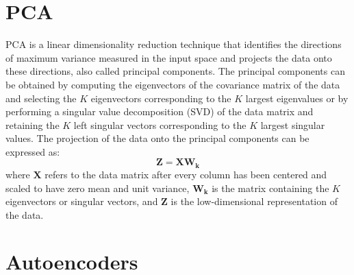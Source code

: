 \documentclass[10pt,conference,compsocconf]{IEEEtran}
\begin{document}
\section[]{PCA}
PCA is a linear dimensionality reduction technique that identifies the directions of maximum variance measured in the input space and projects the data onto these directions, also called principal components. The principal components can be obtained by computing the eigenvectors of the covariance matrix of the data and selecting the \( K \) eigenvectors corresponding to the \( K \) largest eigenvalues or by performing a  singular value decomposition (SVD) of the data matrix and retaining the \( K \) left singular vectors corresponding to the \( K \) largest singular values. The projection of the data onto the principal components can be expressed as:
\[
\mathbf{Z} = \mathbf{X} \mathbf{W_k}
\]
where $\mathbf{X}$ refers to the data matrix after every column has been centered and scaled to have zero mean and unit variance, \( \mathbf{W_k} \) is the matrix containing the \( K \) eigenvectors or singular vectors, and \( \mathbf{Z} \) is the low-dimensional representation of the data. 
\section{Autoencoders}
\end{document}
